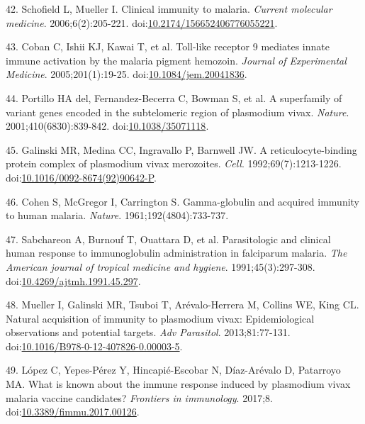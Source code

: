 \documentclass[]{article}
\begin{document}
\hypertarget{ref-schofield2006toll}{}
42. Schofield L, Mueller I. Clinical immunity to malaria. \emph{Current
molecular medicine}. 2006;6(2):205-221.
doi:\href{https://doi.org/10.2174/156652406776055221}{10.2174/156652406776055221}.

\hypertarget{ref-coban2005toll}{}
43. Coban C, Ishii KJ, Kawai T, et al. Toll-like receptor 9 mediates
innate immune activation by the malaria pigment hemozoin. \emph{Journal
of Experimental Medicine}. 2005;201(1):19-25.
doi:\href{https://doi.org/10.1084/jem.20041836}{10.1084/jem.20041836}.

\hypertarget{ref-portillo2001vir}{}
44. Portillo HA del, Fernandez-Becerra C, Bowman S, et al. A superfamily
of variant genes encoded in the subtelomeric region of plasmodium vivax.
\emph{Nature}. 2001;410(6830):839-842.
doi:\href{https://doi.org/10.1038/35071118}{10.1038/35071118}.

\hypertarget{ref-galinski1992rbp}{}
45. Galinski MR, Medina CC, Ingravallo P, Barnwell JW. A
reticulocyte-binding protein complex of plasmodium vivax merozoites.
\emph{Cell}. 1992;69(7):1213-1226.
doi:\href{https://doi.org/10.1016/0092-8674(92)90642-P}{10.1016/0092-8674(92)90642-P}.

\hypertarget{ref-cohen1961}{}
46. Cohen S, McGregor I, Carrington S. Gamma-globulin and acquired
immunity to human malaria. \emph{Nature}. 1961;192(4804):733-737.

\hypertarget{ref-sabchareon1991}{}
47. Sabchareon A, Burnouf T, Ouattara D, et al. Parasitologic and
clinical human response to immunoglobulin administration in falciparum
malaria. \emph{The American journal of tropical medicine and hygiene}.
1991;45(3):297-308.
doi:\href{https://doi.org/10.4269/ajtmh.1991.45.297}{10.4269/ajtmh.1991.45.297}.

\hypertarget{ref-mueller2013}{}
48. Mueller I, Galinski MR, Tsuboi T, Arévalo-Herrera M, Collins WE,
King CL. Natural acquisition of immunity to plasmodium vivax:
Epidemiological observations and potential targets. \emph{Adv
Parasitol}. 2013;81:77-131.
doi:\href{https://doi.org/10.1016/B978-0-12-407826-0.00003-5}{10.1016/B978-0-12-407826-0.00003-5}.

\hypertarget{ref-lopez2017}{}
49. López C, Yepes-Pérez Y, Hincapié-Escobar N, Díaz-Arévalo D,
Patarroyo MA. What is known about the immune response induced by
plasmodium vivax malaria vaccine candidates? \emph{Frontiers in
immunology}. 2017;8.
doi:\href{https://doi.org/10.3389/fimmu.2017.00126}{10.3389/fimmu.2017.00126}.
\end{document}
